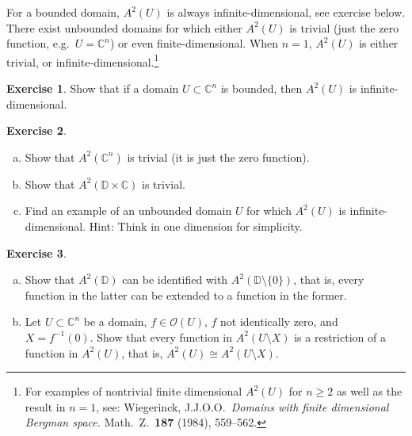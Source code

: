 \documentclass[12pt,openany]{book}
\newcommand{\C}{{\mathbb{C}}}
\newcommand{\D}{{\mathbb{D}}}
\newcommand{\sO}{{\mathscr{O}}}
\theoremstyle{plain}
\theoremstyle{remark}
\theoremstyle{definition}
\newenvironment{exbox}{%
    \def\FrameCommand{\vrule width 1pt \relax\hspace{10pt}}%
    \MakeFramed{\advance\hsize-\width\FrameRestore}%
}{%
    \endMakeFramed
}
\newenvironment{exparts}{%
    \leavevmode\begin{enumerate}[a),noitemsep,topsep=0pt,parsep=0pt,partopsep=0pt]
}{%
    \end{enumerate}
}
\theoremstyle{exercise}
\newtheorem{exercise}{Exercise}[section]
\theoremstyle{example}
\begin{document}
For a bounded domain, $A^2(U)$ is always infinite-dimensional, see exercise
below.  There exist unbounded domains for which either
$A^2(U)$ is trivial (just the zero function, e.g.\ $U=\C^n$)
or even finite-dimensional.
When $n=1$, $A^2(U)$ is either trivial, or
infinite-dimensional.\footnote{For examples of nontrivial finite dimensional
$A^2(U)$ for $n \geq 2$
as well as the result in $n=1$, see:
Wiegerinck, J.J.O.O.\ \emph{Domains with
finite dimensional Bergman space.} Math.\ Z.\ \textbf{187} (1984),
559--562.}

\begin{exbox}
\begin{exercise}
Show that if a domain $U \subset \C^n$ is bounded, then $A^2(U)$ is
infinite-dimensional.
\end{exercise}

\begin{exercise}
\begin{exparts}
\item
Show that $A^2(\C^n)$ is trivial (it is just the zero function).
\item
Show that $A^2(\D \times \C)$ is trivial.
\item
Find an example of an unbounded domain $U$ for which $A^2(U)$ is
infinite-dimensional.
Hint: Think in one dimension for simplicity.
\end{exparts}
\end{exercise}

\begin{exercise} \label{exercise:bergmanpunctureddisc}
\begin{exparts}
\item
Show that $A^2(\D)$ can be identified with $A^2(\D \setminus \{ 0 \})$,
that is, every function in the latter can be extended to a function in the
former.
\item
Let $U \subset \C^n$ be a domain, $f \in \sO(U)$, $f$ not identically zero,
and $X = f^{-1}(0)$.
Show that every function in $A^2(U \setminus X)$ is a restriction of a
function in $A^2(U)$, that is, $A^2(U) \cong A^2(U \setminus X)$.
\end{exparts}
\end{exercise}
\end{exbox}
\end{document}
